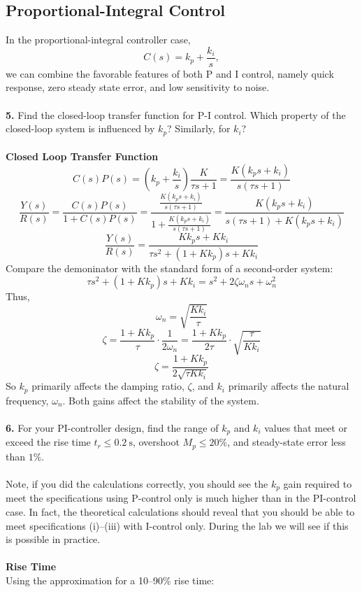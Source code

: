 ﻿\documentclass[12pt]{article}
\begin{document}
\subsection*{Proportional-Integral Control}
In the proportional-integral controller case,
\[
C(s)=k_p+\frac{k_i}{s},
\]
we can combine the favorable features of both P and I control, namely quick response, zero steady state error, and low sensitivity to noise.\\\\
\textbf{5.} Find the closed-loop transfer function for P-I control. Which property of the closed-loop system is influenced by $k_p$? Similarly, for $k_i$?\\\\
\textbf{Closed Loop Transfer Function}
\[C(s)P(s) = \left(k_p+\frac{k_i}{s}\right) \frac{K}{\tau s+1} = \frac{K(k_p s+k_i)}{s(\tau s+1)}\]
\[\frac{Y(s)}{R(s)} = \frac{C(s)P(s)}{1+C(s)P(s)} = \frac{\frac{K(k_p s+k_i)}{s(\tau s+1)}}{1+\frac{K(k_p s+k_i)}{s(\tau s+1)}}=\frac{K(k_p s+k_i)}{s(\tau s+1)+K(k_p s+k_i)}\]
\[\boxed{\frac{Y(s)}{R(s)} =\frac{Kk_p s+ Kk_i}{\tau s^2+(1+Kk_p) s + Kk_i}}\]
Compare the demoninator with the standard form of a second-order system:
\[\tau s^2+(1+Kk_p) s + Kk_i = s^2 + 2\zeta \omega_n s + \omega_n^2\]
Thus,
\[\boxed{\omega_n = \sqrt{\frac{Kk_i}{\tau}}}\]
\[\zeta = \frac{1+Kk_p}{\tau}\cdot\frac{1}{2\omega_n} =\frac{1+Kk_p}{2\tau} \cdot \sqrt{\frac{\tau}{Kk_i}}\]
\[\boxed{\zeta  =\frac{1+Kk_p}{2\sqrt{\tau Kk_i}}}\]
So $k_p$ primarily affects the damping ratio, $\zeta$, and $k_i$ primarily affects the natural frequency, $\omega_n$. Both gains affect the stability of the system.\\\\
\textbf{6.} For your PI-controller design, find the range of $k_p$ and $k_i$ values that meet or exceed the rise time $t_r \leq 0.2~\mathrm{s}$, overshoot $M_p \leq 20\%$, and steady-state error less than $1\%$.\\\\
Note, if you did the calculations correctly, you should see the $k_p$ gain required to meet the specifications using P-control only is much higher than in the PI-control case. In fact, the theoretical calculations should reveal that you should be able to meet specifications (i)--(iii) with I-control only. During the lab we will see if this is possible in practice.\\\\
\textbf{Rise Time}\\
Using the approximation for a 10--90\% rise time:
\end{document}
